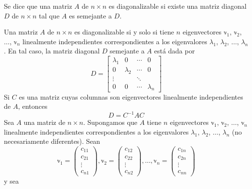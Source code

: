 \begin{definition}
    Se dice que una matriz $A$ de $n \times n$ es diagonalizable si existe una matriz diagonal $D$ de $n \times n$ tal que $A$ es semejante a $D$.
\end{definition}

\begin{theorem}
    Una matriz $A$ de $n \times n$ es diagonalizable si y solo si tiene $n$ eigenvectores $\mathbb{v}_1$, $\mathbb{v}_2$, $\dots$, $\mathbb{v}_n$ linealmente independientes correspondientes a los eigenvalores $\lambda_1$, $\lambda_2$, $\dots$, $\lambda_n$. En tal caso, la matriz diagonal $D$ semejante a $A$ está dada por
    $$D = \begin{bmatrix}
        \lambda_1 & 0 & \cdots & 0 \\
        0 & \lambda_2 & \cdots & 0 \\
        \vdots & & \ddots & \\
        0 & 0 & \cdots & \lambda_n
    \end{bmatrix}$$\newpage\noindent
    Si $C$ es una matriz cuyas columnas son eigenvectores linealmente independientes de $A$, entonces
    $$D = C^{-1}AC$$
    \demostracion Sea $A$ una matriz de $n \times n$. Supongamos que $A$ tiene $n$ eigenvectores $\mathbb{v}_1$, $\mathbb{v}_2$, $\dots$, $\mathbb{v}_n$ linealmente independientes correspondientes a los eigenvalores $\lambda_1$, $\lambda_2$, $\dots$, $\lambda_n$ (no necesariamente diferentes). Sean
    $$\mathbb{v}_1 = \begin{pmatrix} c_{11} \\ c_{21} \\ \vdots \\ c_{n1} \end{pmatrix}, \mathbb{v}_2 = \begin{pmatrix} c_{12} \\ c_{22} \\ \vdots \\ c_{n2} \end{pmatrix}, \dots, \mathbb{v}_n = \begin{pmatrix} c_{1n} \\ c_{2n} \\ \vdots \\ c_{nn} \end{pmatrix}$$
    y sea

\end{theorem}
